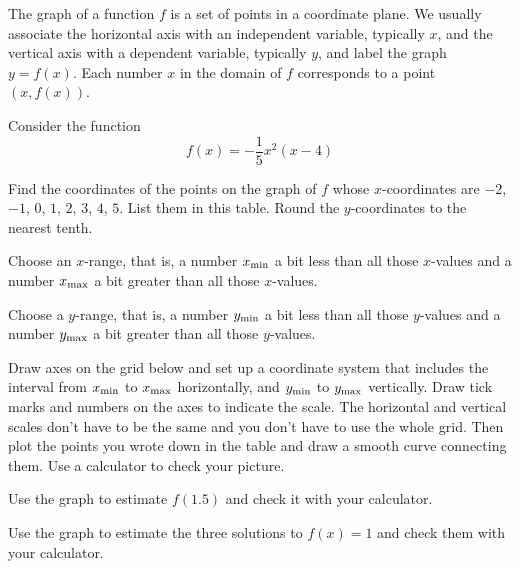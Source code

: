 
The graph of a function $f$ is a set of points in a coordinate plane.
We usually associate the horizontal axis with an independent variable, typically $x$, and the vertical axis with a dependent variable, typically $y$, and label the graph $y = f(x)$.
Each number $x$ in the domain of $f$ corresponds to a point $(x, f(x))$.

Consider the function
\begin{equation*}
 f(x) = -\frac{1}{5} x^2 (x - 4)
\end{equation*}
\begin{ProblemSet}[pencil space=0.5in]
 \begin{Problem}[pencil space=0in]
  Find the coordinates of the points on the graph of $f$ whose $x$-coordinates are $-2$, $-1$, $0$, $1$, $2$, $3$, $4$, $5$.
  List them in this table.
  Round the $y$-coordinates to the nearest tenth.

 \end{Problem}
 \begin{Problem}
  Choose an $x$-range, that is, a number $x_\mathrm{min}$ a bit less than all those $x$-values and a number $x_\mathrm{max}$ a bit greater than all those $x$-values.
 \end{Problem}
 \begin{Problem}
  Choose a $y$-range, that is, a number $y_\mathrm{min}$ a bit less than all those $y$-values and a number $y_\mathrm{max}$ a bit greater than all those $y$-values.
 \end{Problem}
 \begin{Problem}
  Draw axes on the grid below and set up a coordinate system that includes the interval from $x_\mathrm{min}$ to $x_\mathrm{max}$ horizontally, and $y_\mathrm{min}$ to $y_\mathrm{max}$ vertically.
  Draw tick marks and numbers on the axes to indicate the scale.
  The horizontal and vertical scales don't have to be the same and you don't have to use the whole grid.
  Then plot the points you wrote down in the table and draw a smooth curve connecting them.
  Use a calculator to check your picture.

  \bigskip
  \GraphingGrid
 \end{Problem}
 \begin{Problem}
  Use the graph to estimate $f(1.5)$ and check it with your calculator.
 \end{Problem}
 \begin{Problem}
  Use the graph to estimate the three solutions to $f(x) = 1$ and check them with your calculator.
 \end{Problem}
\end{ProblemSet}

